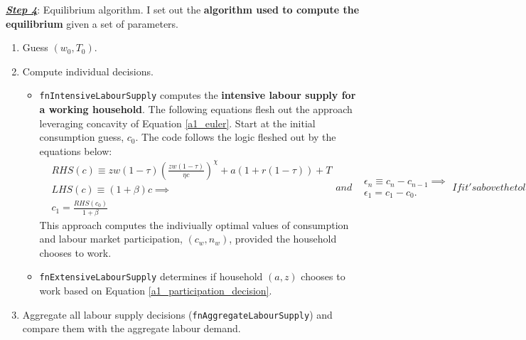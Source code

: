 \colorbox{Gray!25}{\textbf{\textit{\underline{Step 4}}}: Equilibrium algorithm.}
I set out the \textcolor{BurntOrange}{\textbf{algorithm used to compute the equilibrium}} given a set of parameters. 
\begin{enumerate}
    \item Guess $\left(w_0,T_0 \right)$.
    \item Compute individual decisions. 
    \begin{itemize}
        \item \texttt{fnIntensiveLabourSupply} computes the \textcolor{BurntOrange}{\textbf{intensive labour supply for a working household}}. 
        The following equations flesh out the approach leveraging concavity of Equation \eqref{a1_euler}.
        Start at the initial consumption guess, $c_0$. The code follows the logic fleshed out by the equations below:
        \begin{subequations}
            \begin{align}
                & RHS\left(c \right)\equiv z w(1-\tau) \left( \frac{z w(1-\tau)}{\eta c}\right)^\chi +a(1+r(1-\tau))+T \\
                & LHS\left(c \right) \equiv (1+\beta) c \implies \\
                & c_1 = \frac{RHS\left(c_0 \right)}{1+\beta}
            \end{align}
            and 
            \begin{align}
                & \epsilon_n \equiv c_{n} - c_{n-1} \implies \\
                &\epsilon_1 = c_1 - c_0. 
            \end{align}
            If it's above the tolerance level, then repeat until it works:
            \begin{align}
                & c_n = \frac{RHS\left(c_{n-1} \right)}{1+\beta} \implies \\
                & \epsilon_n =c_{n} - c_{n-1}.
            \end{align}
        \end{subequations}
        This approach computes the indiviually optimal values of consumption and labour market participation, $\left(c_w, n_w \right)$, provided the household chooses to work.\vspace{3mm}

        \item \texttt{fnExtensiveLabourSupply} determines if household $(a,z)$ chooses to work based on Equation \eqref{a1_participation_decision}.  
    \end{itemize}
    \item Aggregate all labour supply decisions (\texttt{fnAggregateLabourSupply}) and compare them with the aggregate labour demand.  
\end{enumerate}
